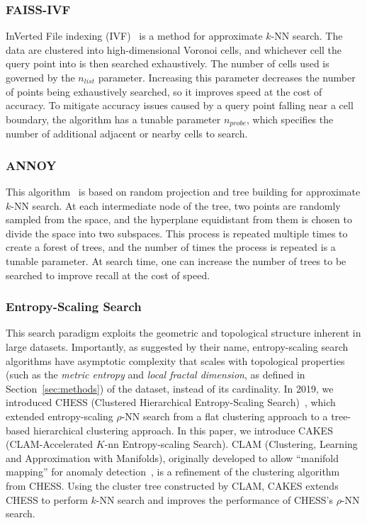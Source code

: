 \subsubsection{FAISS-IVF}
\label{sec:introduction:related-works:faiss-ivf}

InVerted File indexing (IVF)~\cite{faissivf, sacks1987multikey, kent1990signature} is a method for approximate $k$-NN search. 
The data are clustered into high-dimensional Voronoi cells, and whichever cell the query point into is then searched exhaustively.
The number of cells used is governed by the $n_{list}$ parameter. 
Increasing this parameter decreases the number of points being exhaustively searched, so it improves speed at the cost of accuracy.
To mitigate accuracy issues caused by a query point falling near a cell boundary, the algorithm has a tunable parameter $n_{probe}$, which specifies the number of additional adjacent or nearby cells to search.


\subsubsection{ANNOY}
\label{sec:introduction:related-works:annoy}

This algorithm~\cite{annoy} is based on random projection and tree building for approximate $k$-NN search.
At each intermediate node of the tree, two points are randomly sampled from the space, and the hyperplane equidistant from them is chosen to divide the space into two subspaces.
This process is repeated multiple times to create a forest of trees, and the number of times the process is repeated is a tunable parameter.
At search time, one can increase the number of trees to be searched to improve recall at the cost of speed.

\subsubsection{Entropy-Scaling Search}
\label{sec:introduction:related-works:entropy-scaling-search}

This search paradigm exploits the geometric and topological structure inherent in large datasets.
Importantly, as suggested by their name, entropy-scaling search algorithms have asymptotic complexity that scales with topological properties (such as the \textit{metric entropy} and \textit{local fractal dimension}, as defined in Section~\ref{sec:methods}) of the dataset, instead of its cardinality.
In 2019, we introduced CHESS (Clustered Hierarchical Entropy-Scaling Search)~\cite{ishaq2019clustered}, which extended entropy-scaling $\rho$-NN search from a flat clustering approach to a tree-based hierarchical clustering approach.
In this paper, we introduce CAKES (CLAM-Accelerated $K$-nn Entropy-scaling Search).
CLAM (Clustering, Learning and Approximation with Manifolds), originally developed to allow ``manifold mapping'' for anomaly detection~\cite{ishaq2021clustered}, is a refinement of the clustering algorithm from CHESS.
Using the cluster tree constructed by CLAM, CAKES extends CHESS to perform $k$-NN search and improves the performance of CHESS's $\rho$-NN search.
